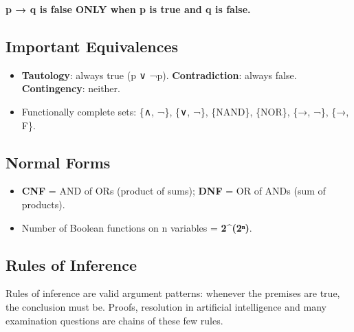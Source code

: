 \endgroup

\textbf{p → q is false ONLY when p is true and q is false.}



\needspace{95pt}

\hypertarget{p2-01--12-important-equivalences}{%
\subsection{Important Equivalences}\label{p2-01--12-important-equivalences}}



\begin{itemize}
\tightlist
\item
  \textbf{Tautology}: always true (p ∨ ¬p). \textbf{Contradiction}: always false. \textbf{Contingency}: neither.
\item
  Functionally complete sets: \{∧, ¬\}, \{∨, ¬\}, \{NAND\}, \{NOR\}, \{→, ¬\}, \{→, F\}.
\end{itemize}

\needspace{95pt}

\hypertarget{p2-01--13-normal-forms}{%
\subsection{Normal Forms}\label{p2-01--13-normal-forms}}

\begin{itemize}
\tightlist
\item
  \textbf{CNF} = AND of ORs (product of sums); \textbf{DNF} = OR of ANDs (sum of products).
\item
  Number of Boolean functions on n variables = \textbf{2\^{}(2ⁿ)}.
\end{itemize}

\needspace{160pt}

\hypertarget{p2-01--14-rules-of-inference}{%
\subsection{Rules of Inference}\label{p2-01--14-rules-of-inference}}

Rules of inference are valid argument patterns: whenever the premises are true, the conclusion must be.
Proofs, resolution in artificial intelligence and many examination questions are chains of these few rules.

\begingroup\small


